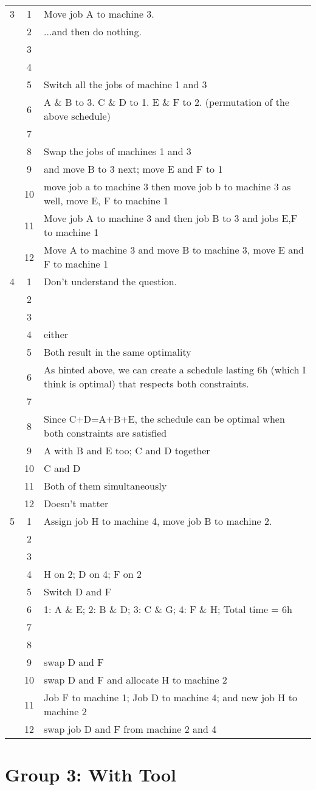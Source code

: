 \begin{tabularx}{\linewidth}{c c X}
	\hline
	3 & 1 & Move job A to machine 3. \\
	& 2 & ...and then do nothing. \\
	& 3 &  \\
	& 4 &  \\
	& 5 & Switch all the jobs of machine 1 and 3 \\
	& 6 & A \& B to 3. C \& D to 1. E \& F to 2. (permutation of the above schedule) \\
	& 7 &  \\
	& 8 & Swap the jobs of machines 1 and 3 \\
	& 9 & and move B to 3 next; move E and F to 1 \\
	& 10 & move job a to machine 3 then move job b to machine 3 as well, move E, F to machine 1 \\
	& 11 & Move job A to machine 3 and then job B to 3 and jobs E,F to machine 1 \\
	& 12 & Move A to machine 3 and move B to machine 3, move E and F to machine 1 \\
	\hline
	4 & 1 & Don't understand the question. \\
	& 2 &  \\
	& 3 &  \\
	& 4 & either \\
	& 5 & Both result in the same optimality \\
	& 6 & As hinted above, we can create a schedule lasting 6h (which I think is optimal) that respects both constraints. \\
	& 7 &  \\
	& 8 & Since C+D=A+B+E, the schedule can be optimal when both constraints are satisfied \\
	& 9 & A with B and E too; C and D together \\
	& 10 & C and D \\
	& 11 & Both of them simultaneously \\
	& 12 & Doesn't matter \\
	\hline
	5 & 1 & Assign job H to machine 4, move job B to machine 2. \\
	& 2 &  \\
	& 3 &  \\
	& 4 & H on 2; D on 4; F on 2 \\
	& 5 & Switch D and F \\
	& 6 & 1: A \& E; 2: B \& D; 3: C \& G; 4: F \& H; Total time = 6h \\
	& 7 &  \\
	& 8 &  \\
	& 9 & swap D and F \\
	& 10 & swap D and F and allocate H to machine 2 \\
	& 11 & Job F to machine 1; Job D to machine 4; and new job H to machine 2 \\
	& 12 & swap job D and F from machine 2 and 4 \\
\end{tabularx}

\newpage
\section{Group 3: With Tool}
\label{group3data}